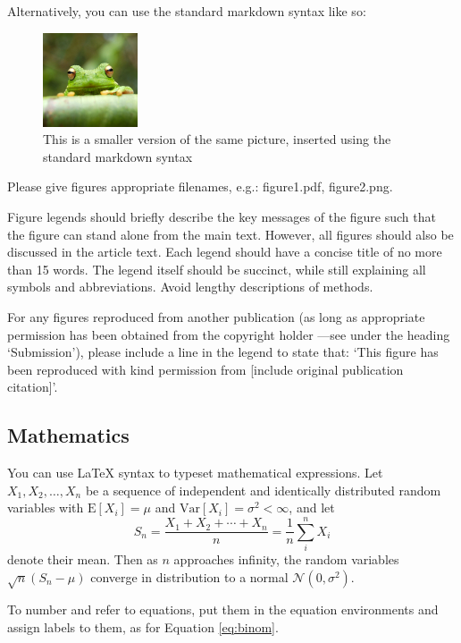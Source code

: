 \documentclass[9pt,a4paper,]{extarticle}
\begin{document}
Alternatively, you can use the standard markdown syntax like so:

\begin{figure}[htbp]
\centering
\includegraphics[width=0.25000\textwidth]{frog.jpg}
\caption{This is a smaller version of the same picture, inserted using
the standard markdown syntax}
\end{figure}

Please give figures appropriate filenames, e.g.: figure1.pdf,
figure2.png.

Figure legends should briefly describe the key messages of the figure
such that the figure can stand alone from the main text. However, all
figures should also be discussed in the article text. Each legend should
have a concise title of no more than 15 words. The legend itself should
be succinct, while still explaining all symbols and abbreviations. Avoid
lengthy descriptions of methods.

For any figures reproduced from another publication (as long as
appropriate permission has been obtained from the copyright holder
---see under the heading `Submission'), please include a line in the
legend to state that: `This figure has been reproduced with kind
permission from {[}include original publication citation{]}'.

\subsection{Mathematics}\label{mathematics}

You can use LaTeX syntax to typeset mathematical expressions. Let
\(X_1, X_2, \ldots, X_n\) be a sequence of independent and identically
distributed random variables with \(\text{E}[X_i] = \mu\) and
\(\text{Var}[X_i] = \sigma^2 < \infty\), and let
\[S_n = \frac{X_1 + X_2 + \cdots + X_n}{n}
      = \frac{1}{n}\sum_{i}^{n} X_i\] denote their mean. Then as \(n\)
approaches infinity, the random variables \(\sqrt{n}(S_n - \mu)\)
converge in distribution to a normal \(\mathcal{N}(0, \sigma^2)\).

To number and refer to equations, put them in the equation environments
and assign labels to them, as for Equation \eqref{eq:binom}.
\end{document}
